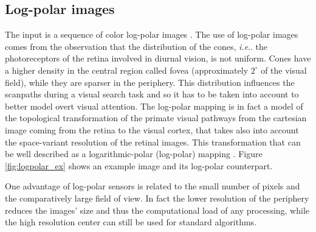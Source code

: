 \documentclass{llncs}
\makeatletter
\DeclareRobustCommand\onedot{\futurelet\@let@token\@onedot}
\def\@onedot{\ifx\@let@token.\else.\null\fi\xspace}
\def\ie{\emph{i.e}\onedot} \def\Ie{\emph{I.e}\onedot}
\makeatother
\begin{document}
\subsection{Log-polar images}
The input is a sequence of color log-polar images \cite{SandiniT80,SandiniQSM00}.
The use of log-polar images comes from the
observation that the distribution of the cones, \ie the
photoreceptors of the retina involved in diurnal vision,
is not uniform. Cones have a higher density
in the central region called fovea (approximately $2^\circ$ of
the visual field), while they are sparser in the
periphery.
This distribution influences the
scanpaths during a visual search task \cite{WolfeG96} and so it has to
be taken into account to better model overt visual
attention. The log-polar mapping is in fact a model of the topological
transformation of the primate visual pathways from the
cartesian image coming from the retina to the visual cortex, that takes also into
account the space-variant resolution of the retinal images.
This transformation that can be well
described as a logarithmic-polar (log-polar) mapping \cite{SandiniT80}.
Figure \ref{fig:logpolar_ex} shows an example image and its
log-polar counterpart.

One advantage of log-polar sensors is related to the small
number of pixels and the comparatively large field of view.
In fact the lower resolution of the periphery reduces the
images' size and thus the computational load of any
processing, while the high resolution center can still be
used for standard algorithms.

\end{document}
